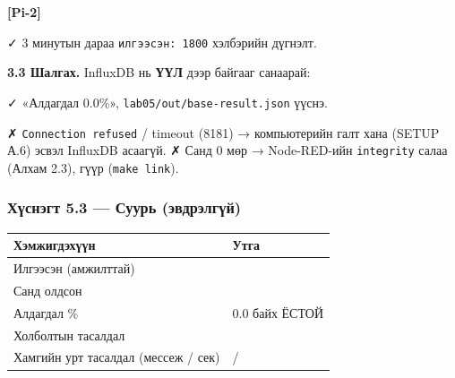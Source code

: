 \textbf{{[}Pi-2{]}}

\begin{Shaded}
\begin{Highlighting}[]
 \KeywordTok{\textbackslash{}}
\end{Highlighting}
\end{Shaded}

✓ 3 минутын дараа \texttt{илгээсэн:\ 1800} хэлбэрийн дүгнэлт.

\textbf{3.3 Шалгах.} InfluxDB нь \textbf{ҮҮЛ} дээр байгааг санаарай:

\begin{Shaded}
\begin{Highlighting}[]
  \KeywordTok{\textbackslash{}}
\end{Highlighting}
\end{Shaded}

✓ «Алдагдал 0.0\%», \texttt{lab05/\allowbreak{}out/\allowbreak{}base-result.\allowbreak{}json} үүснэ.

✗ \texttt{Connection\ refused} / timeout (8181) → компьютерийн галт хана (SETUP А.6) эсвэл InfluxDB асаагүй. ✗ Санд 0 мөр → Node-RED-ийн \texttt{integrity} салаа (Алхам 2.3), гүүр (\texttt{make\ link}).

\hypertarget{ux445ux4afux441ux43dux44dux433ux442-5.3-ux441ux443ux443ux440ux44c-ux44dux432ux434ux440ux44dux43bux433ux4afux439}{%
\subsubsection{Хүснэгт 5.3 --- Суурь (эвдрэлгүй)}\label{ux445ux4afux441ux43dux44dux433ux442-5.3-ux441ux443ux443ux440ux44c-ux44dux432ux434ux440ux44dux43bux433ux4afux439}}

\begingroup\scriptsize\begin{longtable}[]{@{}ll@{}}
\toprule
Хэмжигдэхүүн & Утга\tabularnewline
\midrule
\endhead
Илгээсэн (амжилттай) &\tabularnewline
Санд олдсон &\tabularnewline
Алдагдал \% & 0.0 байх ЁСТОЙ\tabularnewline
Холболтын тасалдал &\tabularnewline
Хамгийн урт тасалдал (мессеж / сек) & /\tabularnewline
\bottomrule
\end{longtable}\endgroup

